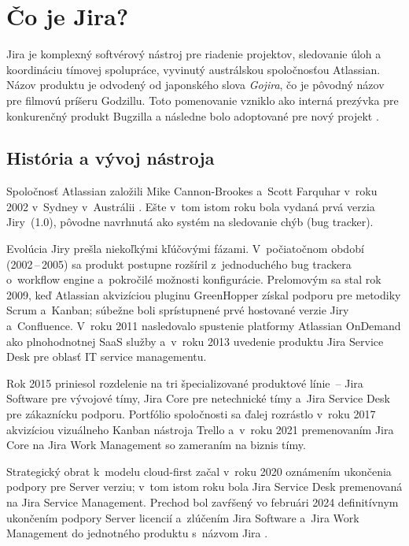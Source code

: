 
\chapter{Čo je Jira?}\label{ch:co-je-jira}

Jira je komplexný softvérový nástroj pre riadenie projektov, sledovanie úloh a koordináciu tímovej spolupráce, vyvinutý austrálskou spoločnosťou Atlassian. Názov produktu je odvodený od japonského slova \textit{Gojira}, čo je pôvodný názov pre filmovú príšeru Godzillu. Toto pomenovanie vzniklo ako interná prezývka pre konkurenčný produkt Bugzilla a následne bolo adoptované pre nový projekt \cite{atlassian_history2023}.

\section{História a vývoj nástroja}

Spoločnosť Atlassian založili Mike Cannon-Brookes a~Scott Farquhar v~roku 2002 v~Sydney v~Austrálii \cite{atlassian_company2024}. Ešte v~tom istom roku bola vydaná prvá verzia Jiry~(1.0), pôvodne navrhnutá ako systém na sledovanie chýb (bug tracker).

Evolúcia Jiry prešla niekoľkými kľúčovými fázami. V~počiatočnom období (2002\,--\,2005) sa produkt postupne rozšíril z~jednoduchého bug trackera o~workflow engine a~pokročilé možnosti konfigurácie. Prelomovým sa stal rok 2009, keď Atlassian akvizíciou pluginu GreenHopper získal podporu pre metodiky Scrum a~Kanban; súbežne boli sprístupnené prvé hostované verzie Jiry a~Confluence. V~roku 2011 nasledovalo spustenie platformy Atlassian OnDemand ako plnohodnotnej SaaS služby a~v~roku 2013 uvedenie produktu Jira Service Desk pre oblasť IT service managementu.

Rok 2015 priniesol rozdelenie na tri špecializované produktové línie~-- Jira Software pre vývojové tímy, Jira Core pre netechnické tímy a~Jira Service Desk pre zákaznícku podporu. Portfólio spoločnosti sa ďalej rozrástlo v~roku 2017 akvizíciou vizuálneho Kanban nástroja Trello a~v~roku 2021 premenovaním Jira Core na Jira Work Management so zameraním na biznis tímy.

Strategický obrat k~modelu cloud-first začal v~roku 2020 oznámením ukončenia podpory pre Server verziu; v~tom istom roku bola Jira Service Desk premenovaná na Jira Service Management. Prechod bol zavŕšený vo februári 2024 definitívnym ukončením podpory Server licencií a~zlúčením Jira Software a~Jira Work Management do jednotného produktu s~názvom Jira \cite{atlassian_server_end2024}.

